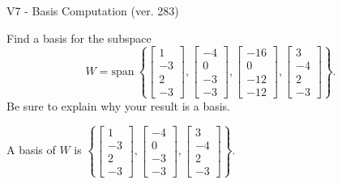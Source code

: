 \begin{exercise}
  \begin{exerciseTitle}V7 - Basis Computation (ver. 283)\end{exerciseTitle}
  \begin{exerciseStatement}
    Find a basis for the subspace 
\[W=\mathrm{span}\ \left\{\left[\begin{array}{r}
1 \\
-3 \\
2 \\
-3
\end{array}\right] , \left[\begin{array}{r}
-4 \\
0 \\
-3 \\
-3
\end{array}\right] , \left[\begin{array}{r}
-16 \\
0 \\
-12 \\
-12
\end{array}\right] , \left[\begin{array}{r}
3 \\
-4 \\
2 \\
-3
\end{array}\right]\right\}.\]
 Be sure to explain why your result is a basis.


  \end{exerciseStatement}
  \begin{exerciseAnswer}
   A basis of \(W\) is  \(\left\{\left[\begin{array}{r}
1 \\
-3 \\
2 \\
-3
\end{array}\right] , \left[\begin{array}{r}
-4 \\
0 \\
-3 \\
-3
\end{array}\right] , \left[\begin{array}{r}
3 \\
-4 \\
2 \\
-3
\end{array}\right]\right\}\).
  


  \end{exerciseAnswer}
\end{exercise}